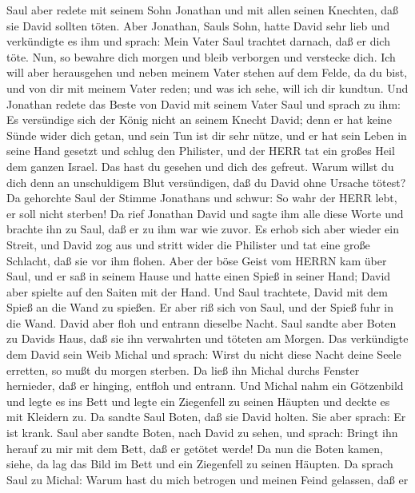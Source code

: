  Saul aber redete mit seinem Sohn Jonathan und mit allen
seinen Knechten, daß sie David sollten töten. Aber Jonathan, Sauls Sohn,
hatte David sehr lieb  und verkündigte es ihm und sprach:
Mein Vater Saul trachtet darnach, daß er dich töte. Nun, so bewahre dich
morgen und bleib verborgen und verstecke dich.  Ich will
aber herausgehen und neben meinem Vater stehen auf dem Felde, da du
bist, und von dir mit meinem Vater reden; und was ich sehe, will ich dir
kundtun.  Und Jonathan redete das Beste von David mit seinem
Vater Saul und sprach zu ihm: Es versündige sich der König nicht an
seinem Knecht David; denn er hat keine Sünde wider dich getan, und sein
Tun ist dir sehr nütze,  und er hat sein Leben in seine Hand
gesetzt und schlug den Philister, und der HERR tat ein großes Heil dem
ganzen Israel. Das hast du gesehen und dich des gefreut. Warum willst du
dich denn an unschuldigem Blut versündigen, daß du David ohne Ursache
tötest?  Da gehorchte Saul der Stimme Jonathans und schwur:
So wahr der HERR lebt, er soll nicht sterben!  Da rief
Jonathan David und sagte ihm alle diese Worte und brachte ihn zu Saul,
daß er zu ihm war wie zuvor.  Es erhob sich aber wieder ein
Streit, und David zog aus und stritt wider die Philister und tat eine
große Schlacht, daß sie vor ihm flohen.  Aber der böse Geist
vom HERRN kam über Saul, und er saß in seinem Hause und hatte einen
Spieß in seiner Hand; David aber spielte auf den Saiten mit der Hand.
 Und Saul trachtete, David mit dem Spieß an die Wand zu
spießen. Er aber riß sich von Saul, und der Spieß fuhr in die Wand.
David aber floh und entrann dieselbe Nacht.  Saul sandte
aber Boten zu Davids Haus, daß sie ihn verwahrten und töteten am Morgen.
Das verkündigte dem David sein Weib Michal und sprach: Wirst du nicht
diese Nacht deine Seele erretten, so mußt du morgen sterben.
 Da ließ ihn Michal durchs Fenster hernieder, daß er
hinging, entfloh und entrann.  Und Michal nahm ein
Götzenbild und legte es ins Bett und legte ein Ziegenfell zu seinen
Häupten und deckte es mit Kleidern zu.  Da sandte Saul
Boten, daß sie David holten. Sie aber sprach: Er ist krank.
 Saul aber sandte Boten, nach David zu sehen, und sprach:
Bringt ihn herauf zu mir mit dem Bett, daß er getötet werde!
 Da nun die Boten kamen, siehe, da lag das Bild im Bett und
ein Ziegenfell zu seinen Häupten.  Da sprach Saul zu
Michal: Warum hast du mich betrogen und meinen Feind gelassen, daß er
